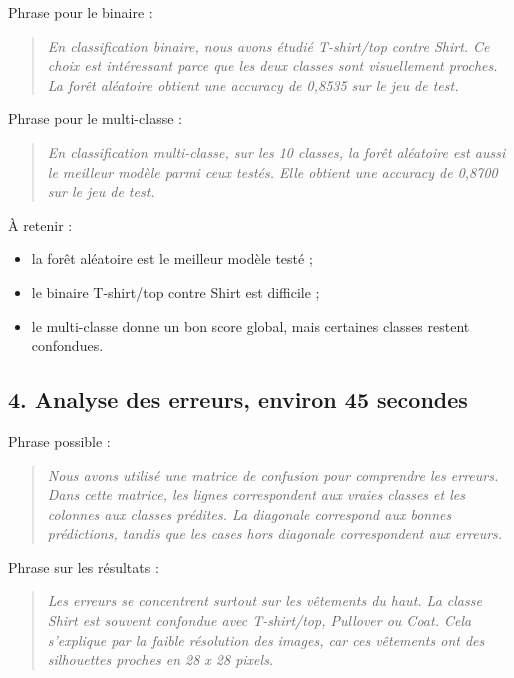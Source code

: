 \documentclass[11pt,a4paper]{article}
\begin{document}
Phrase pour le binaire :

\begin{quote}
\itshape En classification binaire, nous avons étudié T-shirt/top contre Shirt. Ce choix est intéressant parce que les deux classes sont visuellement proches. La forêt aléatoire obtient une accuracy de 0,8535 sur le jeu de test.
\end{quote}

Phrase pour le multi-classe :

\begin{quote}
\itshape En classification multi-classe, sur les 10 classes, la forêt aléatoire est aussi le meilleur modèle parmi ceux testés. Elle obtient une accuracy de 0,8700 sur le jeu de test.
\end{quote}

À retenir :

\begin{itemize}
\item la forêt aléatoire est le meilleur modèle testé ;
\item le binaire T-shirt/top contre Shirt est difficile ;
\item le multi-classe donne un bon score global, mais certaines classes restent confondues.
\end{itemize}

\subsection{4. Analyse des erreurs, environ 45 secondes}

Phrase possible :

\begin{quote}
\itshape Nous avons utilisé une matrice de confusion pour comprendre les erreurs. Dans cette matrice, les lignes correspondent aux vraies classes et les colonnes aux classes prédites. La diagonale correspond aux bonnes prédictions, tandis que les cases hors diagonale correspondent aux erreurs.
\end{quote}

Phrase sur les résultats :

\begin{quote}
\itshape Les erreurs se concentrent surtout sur les vêtements du haut. La classe Shirt est souvent confondue avec T-shirt/top, Pullover ou Coat. Cela s'explique par la faible résolution des images, car ces vêtements ont des silhouettes proches en 28 x 28 pixels.
\end{quote}
\end{document}
